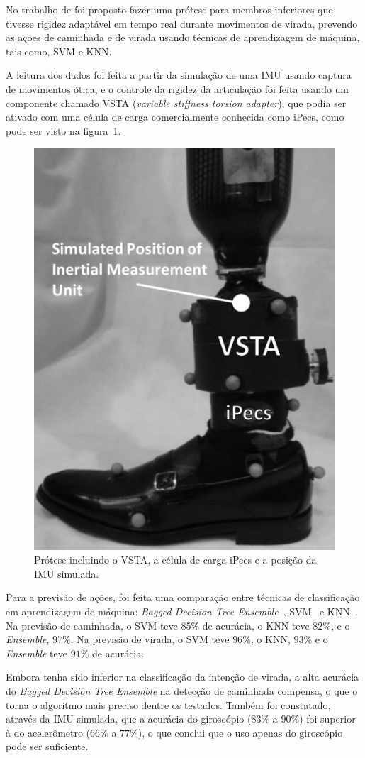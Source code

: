 No trabalho de  foi proposto fazer uma prótese para membros inferiores que tivesse rigidez adaptável em tempo real durante movimentos de virada, prevendo as ações de caminhada e de virada usando técnicas de aprendizagem de máquina, tais como, SVM e KNN\@.

A leitura dos dados foi feita a partir da simulação de uma IMU usando captura de movimentos ótica, e o controle da rigidez da articulação foi feita usando um componente chamado VSTA (\textit{variable stiffness torsion adapter}), que podia ser ativado com uma célula de carga comercialmente conhecida como iPecs, como pode ser visto na figura~\ref{fig:rel_turnintent_1}.

\begin{figure}[ht]
	\caption{\label{fig:rel_turnintent_1}Prótese incluindo o VSTA, a célula de carga iPecs e a posição da IMU simulada.}
	\begin{center}
	    \includegraphics[width=.25\textwidth]{resources/rel_pew_turnintent_1}
	\end{center}
\end{figure}

Para a previsão de ações, foi feita uma comparação entre técnicas de classificação em aprendizagem de máquina: \textit{Bagged Decision Tree Ensemble}~\cite{breiman:1996bagging}\cite{dietterich:2000ensemble}, SVM~\cite{cortes:1995svm} e KNN~\cite{cover:1967knn}\@. Na previsão de caminhada, o SVM teve $85\%$ de acurácia, o KNN teve $82\%$, e o \textit{Ensemble}, $97\%$. Na previsão de virada, o SVM teve $96\%$, o KNN, $93\%$ e o \textit{Ensemble} teve $91\%$ de acurácia.

Embora tenha sido inferior na classificação da intenção de virada, a alta acurácia do \textit{Bagged Decision Tree Ensemble} na detecção de caminhada compensa, o que o torna o algoritmo mais preciso dentre os testados. Também foi constatado, através da IMU simulada, que a acurácia do giroscópio ($83\%$ a $90\%$) foi superior à do acelerômetro ($66\%$ a $77\%$), o que conclui que o uso apenas do giroscópio pode ser suficiente.

